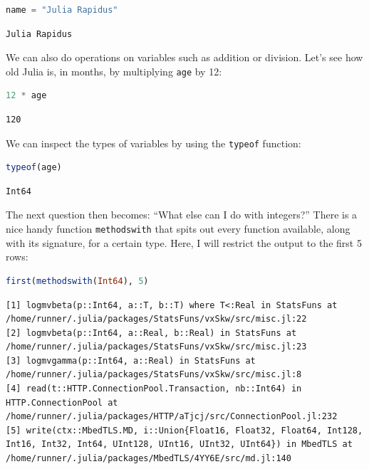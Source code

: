 \documentclass[
  notoc %
]{tufte-book}
\newcommand{\passthrough}[1]{#1}
\begin{document}
\begin{lstlisting}[language=Julia]
name = "Julia Rapidus"
\end{lstlisting}

\begin{lstlisting}[language=Output]
Julia Rapidus
\end{lstlisting}

We can also do operations on variables such as addition or division.
Let's see how old Julia is, in months, by multiplying
\passthrough{\lstinline!age!} by 12:

\begin{lstlisting}[language=Julia]
12 * age
\end{lstlisting}

\begin{lstlisting}[language=Output]
120
\end{lstlisting}

We can inspect the types of variables by using the
\passthrough{\lstinline!typeof!} function:

\begin{lstlisting}[language=Julia]
typeof(age)
\end{lstlisting}

\begin{lstlisting}[language=Output]
Int64
\end{lstlisting}

The next question then becomes: ``What else can I do with integers?''
There is a nice handy function \passthrough{\lstinline!methodswith!}
that spits out every function available, along with its signature, for a
certain type. Here, I will restrict the output to the first 5 rows:

\begin{lstlisting}[language=Julia]
first(methodswith(Int64), 5)
\end{lstlisting}

\begin{lstlisting}[language=Output]
[1] logmvbeta(p::Int64, a::T, b::T) where T<:Real in StatsFuns at /home/runner/.julia/packages/StatsFuns/vxSkw/src/misc.jl:22
[2] logmvbeta(p::Int64, a::Real, b::Real) in StatsFuns at /home/runner/.julia/packages/StatsFuns/vxSkw/src/misc.jl:23
[3] logmvgamma(p::Int64, a::Real) in StatsFuns at /home/runner/.julia/packages/StatsFuns/vxSkw/src/misc.jl:8
[4] read(t::HTTP.ConnectionPool.Transaction, nb::Int64) in HTTP.ConnectionPool at /home/runner/.julia/packages/HTTP/aTjcj/src/ConnectionPool.jl:232
[5] write(ctx::MbedTLS.MD, i::Union{Float16, Float32, Float64, Int128, Int16, Int32, Int64, UInt128, UInt16, UInt32, UInt64}) in MbedTLS at /home/runner/.julia/packages/MbedTLS/4YY6E/src/md.jl:140
\end{lstlisting}
\end{document}
